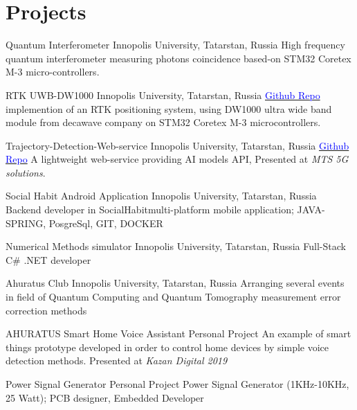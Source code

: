 \section{Projects}

    {Quantum Interferometer}
    {Innopolis University, Tatarstan, Russia}{}{}
    {High frequency quantum interferometer measuring photons coincidence based-on STM32 Coretex M-3 micro-controllers.}
    
    {RTK UWB-DW1000}
    {Innopolis University, Tatarstan, Russia}{}{}
    {\href{https://github.com/Ehsan2754/RTK-DW1000/tree/main/Client}{\textcolor{blue}{Github Repo}}  implemention of an RTK positioning system, using DW1000 ultra wide band module from decawave company on STM32 Coretex M-3 microcontrollers.}

    {Trajectory-Detection-Web-service }
    {Innopolis University, Tatarstan, Russia}{}{}
    {\href{https://github.com/Ahuratus/Trajectory-Detection-Web-services/tree/main/web}{\textcolor{blue}{Github Repo}} A lightweight web-service providing AI models API, Presented  at \textit{MTS 5G solutions}. }

    {Social Habit Android Application}
    {Innopolis University, Tatarstan, Russia}{}{}
    {Backend developer in SocialHabit\texttrademark multi-platform mobile application; JAVA-SPRING, PosgreSql, GIT, DOCKER}
    

    {Numerical Methods simulator}
    {Innopolis University, Tatarstan, Russia}{}{}
    {Full-Stack C\# .NET developer}


    {Ahuratus Club}
    {Innopolis University, Tatarstan, Russia}{}{}
    {Arranging several events in field of Quantum Computing and Quantum Tomography measurement error correction methods}

    {AHURATUS Smart Home Voice Assistant}
    {Personal Project}{}{}
    {An example of smart things prototype developed in order to control home devices by simple voice detection methods. Presented at \textit{Kazan Digital 2019}}

    {Power Signal Generator}
    {Personal Project}{}{}
    {Power Signal Generator (1KHz-10KHz, 25 Watt); PCB designer, Embedded Developer}
